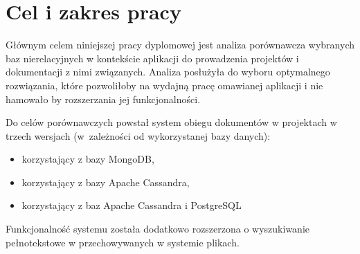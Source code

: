 \section*{Cel i zakres pracy}

Głównym celem niniejszej pracy dyplomowej jest analiza porównawcza wybranych baz nierelacyjnych w kontekście aplikacji do prowadzenia projektów i dokumentacji z nimi związanych. 
Analiza posłużyła do wyboru optymalnego rozwiązania, które pozwoliłoby na wydajną pracę omawianej aplikacji i nie hamowało by rozszerzania jej funkcjonalności.

Do celów porównawczych powstał system obiegu dokumentów w projektach w trzech wersjach (w~zależności od wykorzystanej bazy danych):
\begin{itemize}
    \item korzystający z bazy MongoDB,
    \item korzystający z bazy Apache Cassandra,
    \item korzystający z baz Apache Cassandra i PostgreSQL
\end{itemize}
Funkcjonalność systemu została dodatkowo rozszerzona o wyszukiwanie pełnotekstowe w przechowywanych w systemie plikach.